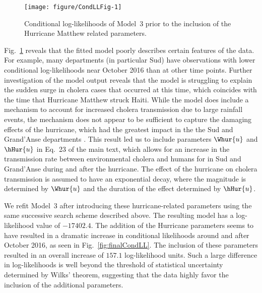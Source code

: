 \begin{figure}[!ht]
\begin{knitrout}
\color{fgcolor}

{\centering \texttt{[image: figure/CondLLFig-1]} 

}


\end{knitrout}
\caption{\label{fig:condLL}Conditional log-likelihoods of Model~3 prior to the inclusion of the Hurricane Matthew related parameters.}
\end{figure}

Fig.~\ref{fig:condLL} reveals that the fitted model poorly describes certain features of the data.
For example, many departments (in particular Sud) have observations with lower conditional log-likelihoods near October 2016 than at other time points.
Further investigation of the model output reveals that the model is struggling to explain the sudden surge in cholera cases that occurred at this time, which coincides with the time that Hurricane Matthew struck Haiti.
While the model does include a mechanism to account for increased cholera transmission due to large rainfall events, the mechanism does not appear to be sufficient to capture the damaging effects of the hurricane, which had the greatest impact in the the Sud and Grand'Anse departments \citep{ferreirai16}.
This result led us to include parameters $\Whur{u}$ and $\hHur{u}$ in Eq.~23 of the main text, which allows for an increase in the transmission rate between environmental cholera and humans for in Sud and Grand'Anse during and after the hurricane.
The effect of the hurricane on cholera transmission is assumed to have an exponential decay, where the magnitude is determined by $\Whur{u}$ and the duration of the effect determined by $\hHur{u}$.



We refit Model~3 after introducing these hurricane-related parameters using the same successive search scheme described above.
The resulting model has a log-likelihood value of $-17402.4$.
The addition of the Hurricane parameters seems to have resulted in a dramatic increase in conditional likelihoods around and after October 2016, as seen in Fig.~\ref{fig:finalCondLL}.
The inclusion of these parameters resulted in an overall increase of $157.1$ log-likelihood units.
Such a large difference in log-likelihoods is well beyond the threshold of statistical uncertainty determined by Wilks' theorem, suggesting that the data highly favor the inclusion of the additional parameters.



